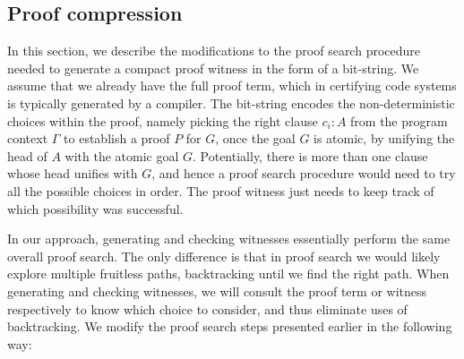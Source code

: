 \documentclass{llncs}
\begin{document}
\subsection{Proof compression}
In this section, we describe the modifications to the proof search
procedure needed to generate a compact proof witness in the form of a
bit-string.  We assume that we already have the full proof term, which
in certifying code systems is typically generated by a compiler.
The bit-string encodes the non-deterministic choices within the proof,
namely picking the right clause $c_i{:}A$ from the program context
$\Gamma$ to establish a proof $P$ for $G$, once the goal $G$ is
atomic, by unifying the head of $A$ with the atomic goal
$G$. Potentially, there is more than one clause whose head unifies
with $G$, and hence a proof search procedure would need to try all the
possible choices in order. The proof witness just needs to keep track
of which possibility was successful.


In our approach, generating and checking witnesses essentially perform
the same overall proof search. The only difference is that in proof
search we would likely explore multiple fruitless paths,
backtracking until we find the right path. When generating and
checking witnesses, we will consult the proof term or witness
respectively to know which choice to consider, and thus eliminate uses
of backtracking.  We modify the proof search steps presented earlier
in the following way:
\end{document}
